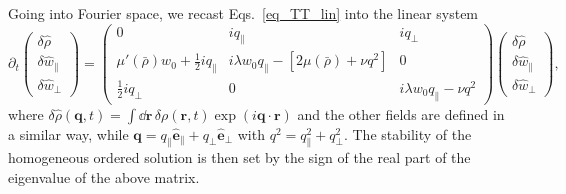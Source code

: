 Going into Fourier space, we recast Eqs.~\eqref{eq_TT_lin} into the linear system
\begin{equation*}
    \partial_t \begin{pmatrix}
        \delta\hat{\rho} \\
        \delta\hat{w}_\| \\
        \delta\hat{w}_\perp
    \end{pmatrix} = 
    \begin{pmatrix}
        0 & i q_\| & i q_\perp \\
        \mu'(\bar\rho)w_0 + \tfrac{1}{2}i q_\| & i\lambda w_0 q_\| - [2\mu(\bar\rho) + \nu q^2] & 0 \\
        \tfrac{1}{2}i q_\perp & 0 & i\lambda w_0 q_\| - \nu q^2
    \end{pmatrix}
    \begin{pmatrix}
        \delta\hat{\rho} \\
        \delta\hat{w}_\| \\
        \delta\hat{w}_\perp
    \end{pmatrix},
\end{equation*}
where $\delta\hat{\rho}(\bm q,t) = \int\dd\bm r \, \delta\rho(\bm r,t)\exp(i\bm q\cdot\bm r)$ and the other fields are defined in a similar way, while $\bm q = q_\|\hat{\bm e}_\| + q_\perp\hat{\bm e}_\perp$ with $q^2 = q_\|^2 + q_\perp^2$.
The stability of the homogeneous ordered solution is then set by the sign of the real part of the eigenvalue of the above matrix.

